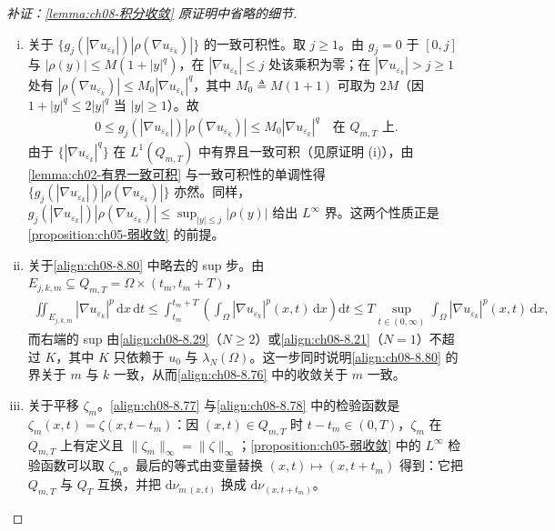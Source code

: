 \documentclass[../../main.tex]{subfiles}%
\begin{document}
\begin{proof}[补证：\cref{lemma:ch08-积分收敛} 原证明中省略的细节]
\begin{enumerate}[(i)]
\item 关于 $\{g_j(|\nabla u_{\varepsilon_k}|)|\rho(\nabla u_{\varepsilon_k})|\}$ 的一致可积性。取 $j\geqslant1$。由 $g_j=0$ 于 $[0,j]$ 与 $|\rho(y)|\leqslant M(1+|y|^q)$，在 $|\nabla u_{\varepsilon_k}|\leqslant j$ 处该乘积为零；在 $|\nabla u_{\varepsilon_k}|>j\geqslant1$ 处有 $|\rho(\nabla u_{\varepsilon_k})|\leqslant M_0|\nabla u_{\varepsilon_k}|^q$，其中 $M_0\triangleq M(1+1)$ 可取为 $2M$（因 $1+|y|^q\leqslant2|y|^q$ 当 $|y|\geqslant1$）。故
\begin{align*}
0\leqslant g_j(|\nabla u_{\varepsilon_k}|)|\rho(\nabla u_{\varepsilon_k})|\leqslant M_0|\nabla u_{\varepsilon_k}|^q\quad\text{在 }Q_{m,T}\text{ 上}.
\end{align*}
由于 $\{|\nabla u_{\varepsilon_k}|^q\}$ 在 $L^1(Q_{m,T})$ 中有界且一致可积（见原证明 (i)），由\cref{lemma:ch02-有界一致可积} 与一致可积性的单调性得 $\{g_j(|\nabla u_{\varepsilon_k}|)|\rho(\nabla u_{\varepsilon_k})|\}$ 亦然。同样，$g_j(|\nabla u_{\varepsilon_k}|)|\rho(\nabla u_{\varepsilon_k})|\leqslant\sup_{|y|\leqslant j}|\rho(y)|$ 给出 $L^\infty$ 界。这两个性质正是\cref{proposition:ch05-弱收敛} 的前提。
\item 关于\eqref{align:ch08-8.80} 中略去的 sup 步。由 $E_{j,k,m}\subseteq Q_{m,T}=\Omega\times(t_m,t_m+T)$，
\begin{align*}
\iint_{E_{j,k,m}}|\nabla u_{\varepsilon_k}|^p\,\mathrm{d}x\,\mathrm{d}t
\leqslant\int_{t_m}^{t_m+T}\left(\int_\Omega|\nabla u_{\varepsilon_k}|^p(x,t)\,\mathrm{d}x\right)\mathrm{d}t
\leqslant T\sup_{t\in(0,\infty)}\int_\Omega|\nabla u_{\varepsilon_k}|^p(x,t)\,\mathrm{d}x,
\end{align*}
而右端的 sup 由\eqref{align:ch08-8.29}（$N\geqslant2$）或\eqref{align:ch08-8.21}（$N=1$）不超过 $K$，其中 $K$ 只依赖于 $u_0$ 与 $\lambda_N(\Omega)$。这一步同时说明\eqref{align:ch08-8.80} 的界关于 $m$ 与 $k$ 一致，从而\eqref{align:ch08-8.76} 中的收敛关于 $m$ 一致。
\item 关于平移 $\zeta_m$。\eqref{align:ch08-8.77} 与\eqref{align:ch08-8.78} 中的检验函数是 $\zeta_m(x,t)=\zeta(x,t-t_m)$：因 $(x,t)\in Q_{m,T}$ 时 $t-t_m\in(0,T)$，$\zeta_m$ 在 $Q_{m,T}$ 上有定义且 $\|\zeta_m\|_\infty=\|\zeta\|_\infty$；\cref{proposition:ch05-弱收敛} 中的 $L^\infty$ 检验函数可以取 $\zeta_m$。最后的等式由变量替换 $(x,t)\mapsto(x,t+t_m)$ 得到：它把 $Q_{m,T}$ 与 $Q_T$ 互换，并把 $\mathrm{d}\nu_{m\,(x,t)}$ 换成 $\mathrm{d}\nu_{(x,t+t_m)}$。

\end{enumerate}
\end{proof}
\end{document}
